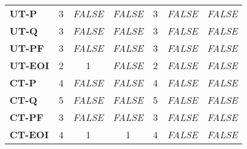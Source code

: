 \documentclass[final_report_innit.tex]{subfiles}
\begin{document}
\begin{center}
\begin{table}
\begin{tabular}[b]{l | c | c | c | c | c | c}
	\textbf{UT-P} & 3 & \textit{FALSE} & \textit{FALSE} & 3 & \textit{FALSE} & \textit{FALSE} \\ %
	\textbf{UT-Q} & 3 & \textit{FALSE} & \textit{FALSE} & 3 & \textit{FALSE} & \textit{FALSE} \\ %
	\textbf{UT-PF} & 3 & \textit{FALSE} & \textit{FALSE} & 3 & \textit{FALSE} & \textit{FALSE} \\ %
	\textbf{UT-EOI} & 2 & 1 & \textit{FALSE} & 2 & \textit{FALSE} & \textit{FALSE} \\ %
	\textbf{CT-P} & 4 & \textit{FALSE} & \textit{FALSE} & 4 & \textit{FALSE} & \textit{FALSE} \\ %
	\textbf{CT-Q} & 5 & \textit{FALSE} & \textit{FALSE} & 5 & \textit{FALSE} & \textit{FALSE} \\ %
	\textbf{CT-PF} & 3 & \textit{FALSE} & \textit{FALSE} & 3 & \textit{FALSE} & \textit{FALSE} \\ %
	\textbf{CT-EOI} & 4 & 1 & 1 & 4 & \textit{FALSE} & \textit{FALSE} \\ %
\end{tabular}
\end{table}
\end{center}

\clearpage
\end{document}
